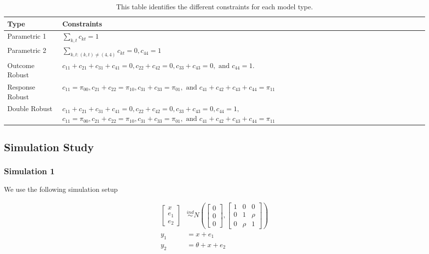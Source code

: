 \documentclass[12pt]{article}
\begin{document}
\begin{table}[ht!]
  \centering
  \caption{This table identifies the different constraints for each model type.}
  \label{tab:mods}
  \begin{tabular}{lp{12cm}}
    \toprule
    Type & Constraints \\
    \midrule
    Parametric 1 & $\sum_{k, t} c_{kt} = 1$ \\
    Parametric 2 &  $\sum_{k, t: (k, t) \neq (4, 4)} c_{kt} = 0, c_{44} = 1$ \\
    Outcome Robust & $c_{11} + c_{21} + c_{31} + c_{41} = 0, c_{22} + c_{42} =
    0, c_{33} + c_{43} = 0, \text{ and } c_{44} = 1.$ \\
    Response Robust & $c_{11} = \pi_{00}, c_{21} + c_{22} = \pi_{10}, c_{31} +
    c_{33} = \pi_{01}, \text{ and } c_{41} + c_{42} + c_{43} + c_{44} =
    \pi_{11}$ \\
    Double Robust & $c_{11} + c_{21} + c_{31} + c_{41} = 0, c_{22} + c_{42} =
    0, c_{33} + c_{43} = 0, c_{44} = 1,$ \hspace{3cm} $
    c_{11} = \pi_{00}, c_{21} + c_{22} = \pi_{10}, c_{31} +
    c_{33} = \pi_{01}, \text{ and } c_{41} + c_{42} + c_{43} + c_{44} = \pi_{11}$ \\
    \bottomrule
  \end{tabular}
\end{table}

\subsection*{Simulation Study}

\subsubsection*{Simulation 1}

We use the following simulation setup

\begin{align*}
  \begin{bmatrix} x \\ e_1 \\ e_2 \end{bmatrix} 
  &\stackrel{ind}{\sim} N\left(\begin{bmatrix} 0 \\ 0 \\ 0 \end{bmatrix}, 
  \begin{bmatrix} 1 & 0 & 0 \\ 0 & 1 & \rho \\ 0 & \rho & 1 \end{bmatrix}\right) \\
  y_1 &= x + e_1 \\
  y_2 &= \theta + x + e_2 \\
\end{align*}
\end{document}
